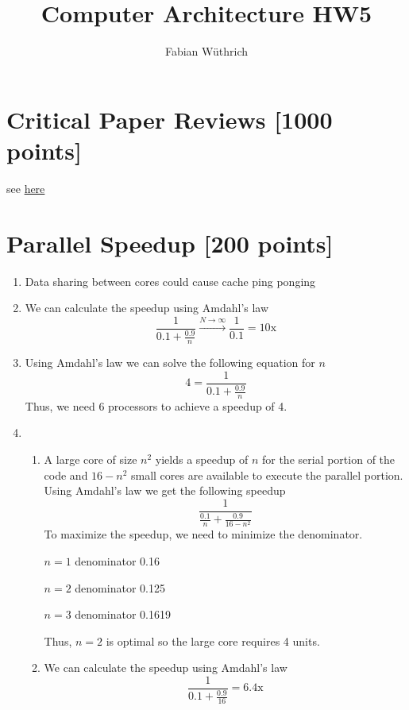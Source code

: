 \documentclass[a4paper]{article}
\title{Computer Architecture HW5}
\author{Fabian Wüthrich}
\begin{document}
\maketitle

\section{Critical Paper Reviews [1000 points]}

see \href{https://safari.ethz.ch/review/architecture20/}{here}

\section{Parallel Speedup [200 points]}

\begin{enumerate}[label=\alph*)]
    \item Data sharing between cores could cause cache ping ponging

    \item We can calculate the speedup using Amdahl's law
        \[ \frac{1}{0.1 + \frac{0.9}{n}}  \xrightarrow{N\to\infty} \frac{1}{0.1} = 10\mathrm{x} \]

    \item Using Amdahl's law we can solve the following equation for $n$
        \[ 4 = \frac{1}{0.1 + \frac{0.9}{n}} \]
        Thus, we need 6 processors to achieve a speedup of 4.
    \item
        \begin{enumerate}[label=\roman*)]
            \item A large core of size $n^2$ yields a speedup of $n$ for the
            serial portion of the code and $16 - n^2$ small cores are available
                to execute the parallel portion. Using Amdahl's law we get the
                following speedup
                \[ \frac{1}{\frac{0.1}{n} + \frac{0.9}{16-n^2}} \]
                To maximize the speedup, we need to minimize the denominator.

                $n=1$ denominator 0.16

                $n=2$ denominator 0.125

                $n=3$ denominator 0.1619

                Thus, $n=2$ is optimal so the large core requires 4 units.

            \item We can calculate the speedup using Amdahl's law
                \[ \frac{1}{0.1 + \frac{0.9}{16}} = 6.4\mathrm{x} \]


\end{enumerate}
\end{enumerate}
\end{document}
